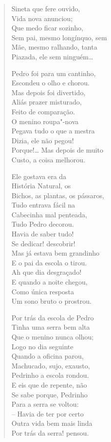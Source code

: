 \begin{verse}
Sineta que fere ouvido,\\
Vida nova anunciou;\\
Que medo ficar sozinho,\\
Sem pai, mesmo longínquo, sem\\
Mãe, mesmo ralhando, tanta\\
Piazada, ele sem ninguém\ldots{}

Pedro foi para um cantinho,\\
Escondeu o olho e chorou.\\
Mas depois foi divertido,\\
Aliás prazer misturado,\\
Feito de comparação.\\
O menino roupa"-nova\\
Pegava tudo o que a mestra\\
Dizia, ele não pegou!\\
Porque!\ldots{} Mas depois de muito\\
Custo, a coisa melhorou.

Ele gostava era da\\
História Natural, os\\
Bichos, as plantas, os pássaros,\\
Tudo entrava fácil na\\
Cabecinha mal penteada,\\
Tudo Pedro decorou.\\
Havia de saber tudo!\\
Se dedicar! descobrir!\\
Mas já estava bem grandinho\\
E o pai da escola o tirou.\\
Ah que dia desgraçado!\\
E quando a noite chegou,\\
Como única resposta\\
Um sono bruto o prostrou.

Por trás da escola de Pedro\\
Tinha uma serra bem alta\\
Que o menino nunca olhou;\\
Logo no dia seguinte\\
Quando a oficina parou,\\
Machucado, sujo, exausto,\\
Pedrinho a escola rondou.\\
E eis que de repente, não\\
Se sabe porque, Pedrinho\\
Para a serra se voltou:\\
-- Havia de ter por certo\\
Outra vida bem mais linda\\
Por trás da serra! pensou.


\end{verse}
